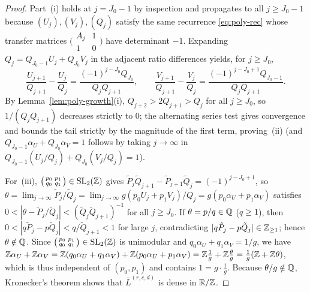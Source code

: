 \begin{proof}
Part~(i) holds at $j=J_0-1$ by inspection and propagates to all $j\ge J_0-1$
because $(U_j),(V_j),(Q_j)$ satisfy the same recurrence \eqref{eq:poly-rec} whose
transfer matrices $\bigl(\begin{smallmatrix}A_j&1\\1&0\end{smallmatrix}\bigr)$
have determinant $-1$. Expanding $Q_j=Q_{J_0-1}U_j+Q_{J_0}V_j$ in the adjacent
ratio differences yields, for $j\ge J_0$,
\[
\frac{U_{j+1}}{Q_{j+1}}-\frac{U_j}{Q_j}
=\frac{(-1)^{j-J_0}Q_{J_0}}{Q_jQ_{j+1}},\qquad
\frac{V_{j+1}}{Q_{j+1}}-\frac{V_j}{Q_j}
=\frac{(-1)^{j-J_0+1}Q_{J_0-1}}{Q_jQ_{j+1}}.
\]
By Lemma~\ref{lem:poly-growth}(i), $Q_{j+2}>2Q_{j+1}>Q_j$ for all $j\ge J_0$,
so $1/(Q_jQ_{j+1})$ decreases strictly to $0$; the alternating series test
gives convergence and bounds the tail strictly by the magnitude of the first
term, proving~(ii) (and $Q_{J_0-1}\alpha_U+Q_{J_0}\alpha_V=1$ follows by taking
$j\to\infty$ in $Q_{J_0-1}(U_j/Q_j)+Q_{J_0}(V_j/Q_j)=1$).

For~(iii), $\bigl(\begin{smallmatrix}p_0&p_1\\q_0&q_1\end{smallmatrix}\bigr)\in\mathrm{SL}_2(\mathbb{Z})$
gives $\tilde P_j\tilde Q_{j+1}-\tilde P_{j+1}\tilde Q_j=(-1)^{j-J_0+1}$, so
$\theta=\lim_{j\to\infty}\tilde P_j/\tilde Q_j=\lim_{j\to\infty}g(p_0U_j+p_1V_j)/Q_j=g(p_0\alpha_U+p_1\alpha_V)$
satisfies $0<|\theta-\tilde P_j/\tilde Q_j|<(\tilde Q_j\tilde Q_{j+1})^{-1}$ for
all $j\ge J_0$. If $\theta=p/q\in\mathbb{Q}$ ($q\ge1$), then
$0<|q\tilde P_j-p\tilde Q_j|<q/\tilde Q_{j+1}<1$ for large $j$, contradicting
$|q\tilde P_j-p\tilde Q_j|\in\mathbb{Z}_{\ge1}$; hence $\theta\notin\mathbb{Q}$. Since
$\bigl(\begin{smallmatrix}p_0&p_1\\q_0&q_1\end{smallmatrix}\bigr)\in\mathrm{SL}_2(\mathbb{Z})$
is unimodular and $q_0\alpha_U+q_1\alpha_V=1/g$, we have
$\mathbb{Z}\alpha_U+\mathbb{Z}\alpha_V=\mathbb{Z}(q_0\alpha_U+q_1\alpha_V)+\mathbb{Z}(p_0\alpha_U+p_1\alpha_V)
=\mathbb{Z}\frac{1}{g}+\mathbb{Z}\frac{\theta}{g}=\frac{1}{g}(\mathbb{Z}+\mathbb{Z}\theta)$, which is thus
independent of $(p_0,p_1)$ and contains $1=g\cdot\frac{1}{g}$. Because
$\theta/g\notin\mathbb{Q}$, Kronecker's theorem shows that $\bar L^{(r,c,d)}$ is dense
in $\mathbb{R}/\mathbb{Z}$.


\end{proof}

